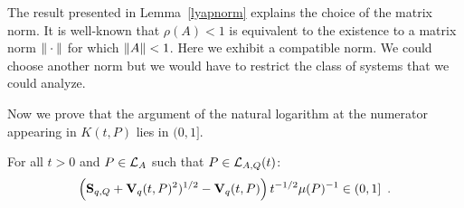 \documentclass[10pt]{llncs}
\begin{document}
%
%
%

The result presented in Lemma~\ref{lyapnorm} explains the choice of the matrix norm. It is well-known that $\rho(A)<1$ is equivalent to the existence to a matrix norm $\| \cdot\|$ for which $\| A\|<1$. Here we exhibit a compatible norm. We could choose another norm but we would have to restrict the class of systems that we could analyze.    

Now we prove that the argument of the natural logarithm at the numerator appearing in $K(t,P)$ lies in $(0,1]$. 

\begin{lemma}
\label{numerator}
For all $t>0$ and $P\in\mathcal{L}_{A}$ such that $P\in\mathcal{L}_{A,Q}(t)$: \[
\left(\mathbf{S}_{q,Q}+\mathbf{V}_{q}(t,P)^2)^{1/2}-\mathbf{V}_{q}(t,P)\right) t^{-1/2}\mu(P)^{-1}\in (0,1]\enspace .
\]
\end{lemma}
\end{document}
